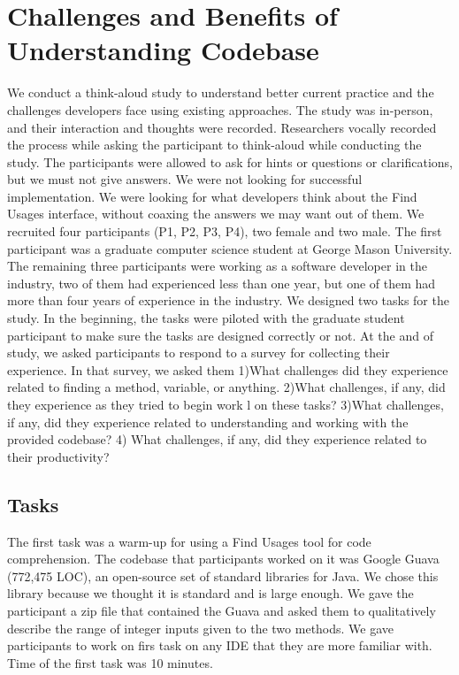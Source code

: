 \documentclass[conference]{IEEEtran}
\begin{document}
\section{Challenges and Benefits of Understanding Codebase}
We conduct a think-aloud study to understand better current practice and the challenges developers face using existing approaches. The study was in-person, and their interaction and thoughts were recorded. Researchers vocally recorded the process while asking the participant to think-aloud while conducting the study. The participants were allowed to ask for hints or questions or clarifications, but we must not give answers.
We were not looking for successful implementation. We were looking for what developers think about the Find Usages interface, without coaxing the answers we may want out of them.
We recruited four participants (P1, P2, P3, P4), two female and two male. The first participant was a graduate computer science student at George Mason University. The remaining three participants were working as a software developer in the industry, two of them had experienced less than one year, but one of them had more than four years of experience in the industry. We designed two tasks for the study. In the beginning, the tasks were piloted with the graduate student participant to make sure the tasks are designed correctly or not. At the and of study, we asked participants to respond to a survey for collecting their experience. In that survey, we asked them 1)What challenges did they experience related to finding a method, variable, or anything. 2)What challenges, if any, did they experience as they tried to begin work l on these tasks? 3)What challenges, if any, did they experience related to understanding and working with the provided codebase? 4) What challenges, if any, did they experience related to their productivity? 

\subsection{Tasks}
\label{tasks}

The first task was a warm-up for using a Find Usages tool for code comprehension. The codebase that participants worked on it was Google Guava (772,475 LOC), an open-source set of standard libraries for Java. We chose this library because we thought it is standard and is large enough. We gave the participant a zip file that contained the Guava and asked them to qualitatively describe the range of integer inputs given to the two methods. We gave participants to work on firs task on any IDE that they are more familiar with. Time of the first task was 10 minutes.\par
\end{document}
